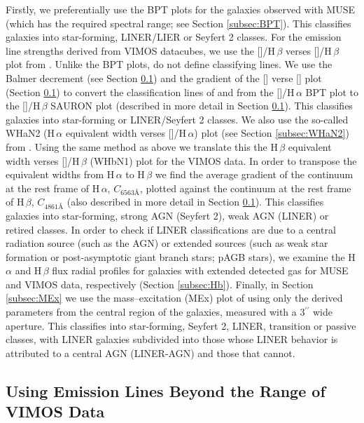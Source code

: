 	Firstly, we preferentially use the BPT plots for the galaxies observed with MUSE (which has the required spectral range; see Section \ref{subsec:BPT}). This classifies galaxies into star-forming, LINER/LIER or Seyfert 2 classes. For the emission line strengths derived from VIMOS datacubes, we use the []/H\,$\beta$ verses []/H\,$\beta$ plot from \citet[hereafter the SAURON plot]{Sarzi2010}. Unlike the BPT plots, \citet{Sarzi2010} do not define classifying lines. We use the Balmer decrement (see Section \ref{subsec:Ndec}) and the gradient of the [] verse [] plot (Section \ref{subsec:Ndec}) to convert the classification lines of \citet{Kewley2001} and \citet{Kauffmann2003a} from the []/H\,$\alpha$ BPT plot to the []/H\,$\beta$ SAURON plot (described in more detail in Section \ref{subsec:Ndec}). This classifies galaxies into star-forming or LINER/Seyfert 2 classes. We also use the so-called WHaN2 (H\,$\alpha$ equivalent width verses []/H\,$\alpha$) plot (see Section \ref{subsec:WHaN2}) from \citet{CidFernandes2011}. Using the same method as above we translate this the H\,$\beta$ equivalent width verses []/H\,$\beta$ (WHbN1) plot for the VIMOS data. In order to transpose the equivalent widths from H\,$\alpha$ to H\,$\beta$ we find the average gradient of the continuum at the rest frame of H\,$\alpha$, $C_\text{6563\AA}$, plotted against the continuum at the rest frame of H\,$\beta$, $C_\text{4861\AA}$ (also described in more detail in Section \ref{subsec:Ndec}). This classifies galaxies into star-forming, strong AGN (Seyfert 2), weak AGN (LINER) or retired classes. In order to check if LINER classifications are due to a central radiation source (such as the AGN) or extended sources (such as weak star formation or post-asymptotic giant branch stars; pAGB stars), we examine the H\,$\alpha$ and H\,$\beta$ flux radial profiles for galaxies with extended detected gas for MUSE and VIMOS data, respectively (Section \ref{subsec:Hb}). Finally, in Section \ref{subsec:MEx} we use the mass--excitation (MEx) plot of \cite{Nyland2016} using only the derived parameters from the central region of the galaxies, measured with a 3$^{\prime\prime}$ wide aperture. This classifies into star-forming, Seyfert 2, LINER, transition or passive classes, with LINER galaxies subdivided into those whose LINER behavior is attributed to a central AGN (LINER-AGN) and those that cannot. 


	\subsection{Using Emission Lines Beyond the Range of VIMOS Data}
		\label{subsec:Ndec}

